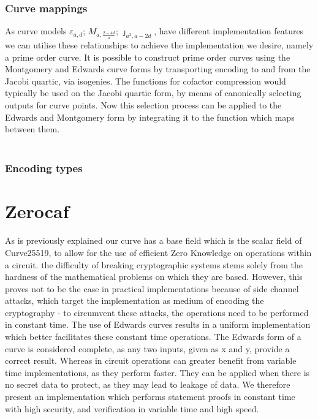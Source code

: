 \documentclass{article}
\begin{document}
\subsubsection {Curve mappings}
As curve models $\varepsilon_{a,d}$; ${M}_{a,\frac{2-4d}{a}}$; $\jmath_{a^{2},a-{2d}}$, have different implementation features we can utilise these relationships to achieve the implementation we desire, namely a prime order curve. It is possible to construct prime order curves using the Montgomery and Edwards curve forms by transporting encoding to and from the Jacobi quartic, via isogenies. The functions for cofactor compression would typically be used on the Jacobi quartic form, by means of canonically selecting outputs for curve points. Now this selection process can be applied to the Edwards and Montgomery form by integrating it to the function which maps between them. \\\\ 

\subsubsection{Encoding types}
\section{Zerocaf}
As is previously explained our curve has a base field which is the scalar field of Curve25519, to allow for the use of efficient Zero Knowledge  on operations within a circuit. the difficulty of breaking cryptographic systems stems solely from the hardness of the mathematical problems on which they are based. However, this proves not to be the case in practical implementations because of side channel attacks, which target the implementation as medium of encoding the cryptography - to circumvent these attacks, the operations need to be performed in constant time. The use of Edwards curves results in a uniform implementation which better facilitates these constant time operations.  The Edwards form of a curve is considered complete, as any two inputs, given as x and y, provide a correct result. Whereas in circuit operations can greater benefit from variable time implementations, as they perform faster. They can be applied when there is no secret data to protect, as they may lead to leakage of data. We therefore present an implementation which performs statement proofs in constant time with high security, and verification in variable time and high speed. \\ 
\end{document}
